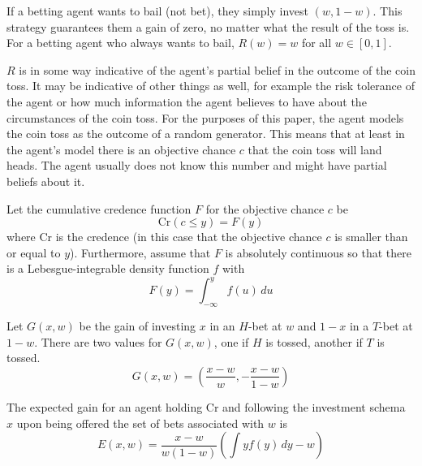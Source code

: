 \documentclass[12pt]{article}
\begin{document}
If a betting agent wants to bail (not bet), they simply invest
$(w,1-w)$. This strategy guarantees them a gain of zero, no matter
what the result of the toss is. For a betting agent who always wants
to bail, $R(w)=w$ for all $w\in[0,1]$.

$R$ is in some way indicative of the agent's partial belief in the
outcome of the coin toss. It may be indicative of other things as
well, for example the risk tolerance of the agent or how much
information the agent believes to have about the circumstances of the
coin toss. For the purposes of this paper, the agent models the coin
toss as the outcome of a random generator. This means that at least in
the agent's model there is an objective chance $c$ that the coin toss
will land heads. The agent usually does not know this number and might
have partial beliefs about it.


Let the cumulative credence function $F$ for the objective chance $c$ be
\begin{equation}
  \label{eq:vooshoov}
  \mbox{Cr}(c\leq{}y)=F(y)
\end{equation}
where Cr is the credence (in this case that the objective chance $c$
is smaller than or equal to $y$). Furthermore, assume that $F$ is
absolutely continuous so that there is a Lebesgue-integrable density
function $f$ with
\begin{equation}
  \label{eq:ovohdaiy}
  F(y)=\int_{-\infty}^{y}f(u)\,du
\end{equation}

Let $G(x,w)$ be the gain of investing $x$ in an $H$-bet at $w$ and
$1-x$ in a $T$-bet at $1-w$. There are two values for $G(x,w)$, one if
$H$ is tossed, another if $T$ is tossed.
\begin{equation}
  \label{eq:boxobohm}
  G(x,w)=\left(\frac{x-w}{w},-\frac{x-w}{1-w}\right)
\end{equation}

\begin{proposition}
  \label{prp:tohboogh}
  The expected gain for an agent holding Cr and following the
  investment schema $x$ upon being offered the set of bets associated
  with $w$ is
\begin{equation}
  \label{eq:aipheeke}
  E(x,w)=\frac{x-w}{w(1-w)}\left(\int{}yf(y)\,dy-w\right)
\end{equation}
\end{proposition}
\end{document}
